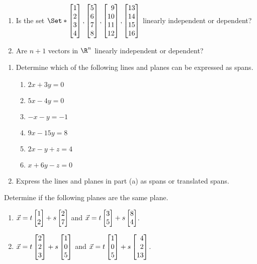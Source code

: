 \begin{exercises}
\begin{problist}
\begin{enumerate}
			\item Is the set $\Set*{\mat{1\\2\\3\\4},\mat{5\\6\\7\\8},
			\mat{9\\10\\11\\12}, \mat{13\\14\\15\\16}}$ linearly independent or dependent?

			\item Are $n+1$ vectors in $\R^n$ linearly independent or dependent?
		\end{enumerate}
		\prob
		\begin{enumerate}
			\item
			Determine which of the following lines and planes can be expressed as spans.
			\begin{enumerate}
				\item $2x+3y=0$
				\item $5x-4y=0$
				\item $-x-y=-1$
				\item $9x-15y=8$
				\item $2x-y+z=4$
				\item	$x+6y-z=0$
			\end{enumerate}
			\item
			Express the lines and planes in part (a) as spans or translated spans.
		\end{enumerate}
		\prob
		Determine if the following planes are the same plane.
		\begin{enumerate}
			\item $\vec x = t\mat{1\\2} + s\mat{2\\7}$ and
						$\vec x = t\mat{3\\5} + s\mat{8\\4}$.
			\item $\vec x = t\mat{2\\2\\3} + s\mat{1\\0\\5}$ and
						$\vec x = t\mat{1\\0\\5} + s\mat{4\\2\\13}$.

\end{enumerate}
\end{problist}
\end{exercises}
